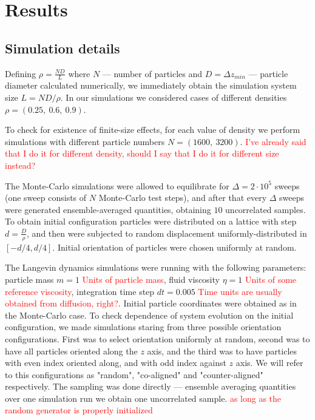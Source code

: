 \section{Results}
\subsection{Simulation details}
\label{subsec:simulation_details}

Defining $\rho = \frac{N D}{L}$ where $N$ --- number of particles and $D = \Delta z_{min}$ --- particle diameter calculated numerically, we immediately obtain the simulation system size $L = N D/ \rho$. In our simulations we considered cases of different densities $\rho = (0.25,\ 0.6,\ 0.9)$.

To check for existence of finite-size effects, for each value of density we perform simulations with different particle numbers $N = (1600,\ 3200)$. \textcolor{red}{I've already said that I do it for different density, should I say that I do it for different size instead?}

The Monte-Carlo simulations were allowed to equilibrate for $\Delta = 2 \cdot 10^5$ sweeps (one sweep consists of $N$ Monte-Carlo test steps), and after that every $\Delta$ sweeps were generated ensemble-averaged quantities, obtaining $10$ uncorrelated samples. To obtain initial configuration particles were distributed on a lattice with step $d = \frac{D}{\rho}$, and then were subjected to random displacement uniformly-distributed in $[-d/4, d/4]$. Initial orientation of particles were chosen uniformly at random.

The Langevin dynamics simulations were running with the following parameters: particle mass $m = 1$ \textcolor{red}{Units of particle mass}, fluid viscosity $\eta = 1$ \textcolor{red}{Units of some reference viscosity}, integration time step $d t = 0.005$ \textcolor{red}{Time units are usually obtained from diffusion, right?}. Initial particle coordinates were obtained as in the Monte-Carlo case. To check dependence of system evolution on the initial configuration, we made simulations staring from three possible orientation configurations. First was to select orientation uniformly at random, second was to have all particles oriented along the $z$ axis, and the third was to have particles with even index oriented along, and with odd index against $z$ axis. We will refer to this configurations as "random", "co-aligned" and "counter-aligned" respectively. The sampling was done directly --- ensemble averaging quantities over one simulation run we obtain one uncorrelated sample. \textcolor{red}{as long as the random generator is properly initialized}

